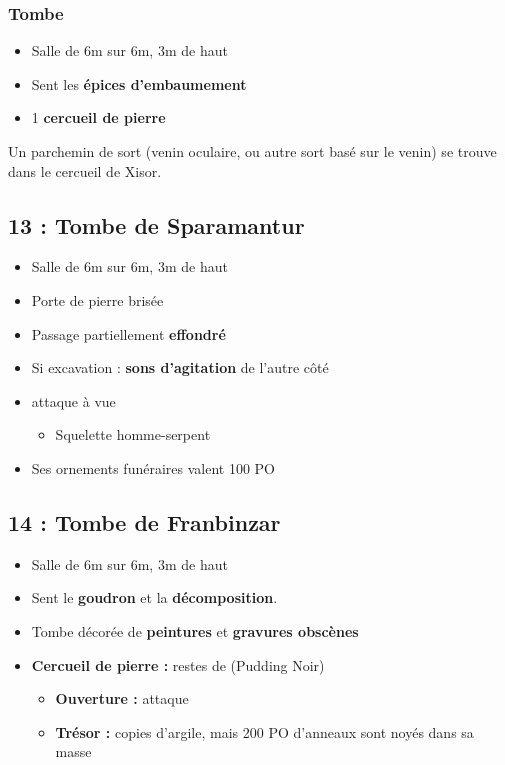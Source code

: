 \subsubsection{Tombe}
\begin{itemize}
  \item Salle de 6m sur 6m, 3m de haut
  \item Sent les \textbf{épices d'embaumement}
  \item 1 \textbf{cercueil de pierre}
\end{itemize}
Un parchemin de sort (venin oculaire, ou autre sort basé sur le venin) se trouve dans le
cercueil de Xisor.

\subsection{13 : Tombe de Sparamantur}\label{n2:s13}
\begin{itemize}
  \item Salle de 6m sur 6m, 3m de haut
  \item Porte de pierre brisée
  \item Passage partiellement \textbf{effondré}
  \item Si excavation : \textbf{sons d'agitation} de l'autre côté
  \item \textbf{} attaque à vue
  \begin{itemize}
    \item Squelette homme-serpent
  \end{itemize}
  \item Ses ornements funéraires valent 100 PO
\end{itemize}

\subsection{14 : Tombe de Franbinzar}\label{n2:s14}
\begin{itemize}
    \item Salle de 6m sur 6m, 3m de haut
    \item Sent le \textbf{goudron} et la \textbf{décomposition}.
    \item Tombe décorée de \textbf{peintures} et \textbf{gravures obscènes}
    \item \textbf{Cercueil de pierre :} restes de \textbf{} (Pudding Noir)
    \begin{itemize}
      \item \textbf{Ouverture :} attaque
      \item \textbf{Trésor :} copies d'argile, mais 200 PO d'anneaux sont noyés dans sa masse
    \end{itemize}
\end{itemize}

